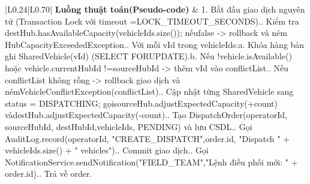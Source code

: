 \begin{longtable}{|L{0.24\textwidth}|L{0.70\textwidth}|}
\textbf{Luồng thuật toán}\newline \textbf{(Pseudo-code)} & 1. Bắt đầu giao dịch nguyên tử (Transaction Lock với timeout =\newline LOCK\_TIMEOUT\_SECONDS).. Kiểm tra destHub.hasAvailableCapacity(vehicleIds.size()); nếu\newline false -> rollback và ném HubCapacityExceededException.. Với mỗi vId trong vehicleIds:\newline a. Khóa hàng bản ghi SharedVehicle(vId) (SELECT FOR\newline UPDATE).\newline b. Nếu !vehicle.isAvailable() hoặc vehicle.currentHubId !=\newline sourceHubId -> thêm vId vào conflictList.. Nếu conflictList không rỗng -> rollback giao dịch và ném\newline VehicleConflictException(conflictList).. Cập nhật từng SharedVehicle sang status = DISPATCHING; gọi\newline sourceHub.adjustExpectedCapacity(+count) và\newline destHub.adjustExpectedCapacity(-count).. Tạo DispatchOrder(operatorId, sourceHubId, destHubId,\newline vehicleIds, PENDING) và lưu CSDL.. Gọi AuditLog.record(operatorId, "CREATE\_DISPATCH",\newline order.id, "Dispatch " + vehicleIds.size() + " vehicles").. Commit giao dịch.. Gọi NotificationService.sendNotification("FIELD\_TEAM",\newline "Lệnh điều phối mới: " + order.id).. Trả về order. \\
\hline
\end{longtable}
\vspace{-0.5\baselineskip}
